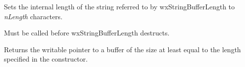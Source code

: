 \label{wxstringbufferlengthsetlength}


Sets the internal length of the string referred to by wxStringBufferLength to 
{\it nLength} characters.

Must be called before wxStringBufferLength destructs.

\label{wxstringbufferlengthwxchar}


Returns the writable pointer to a buffer of the size at least equal to the
length specified in the constructor.


